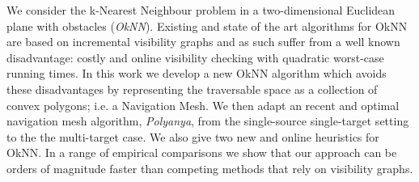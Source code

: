 We consider the k-Nearest Neighbour problem in a 
two-dimensional Euclidean plane with obstacles (\emph{OkNN}).
Existing and state of the art algorithms for OkNN are based on incremental 
visibility graphs and as such suffer from a well known disadvantage: costly 
and online visibility checking with quadratic worst-case running times.
In this work we develop a new OkNN algorithm which avoids these disadvantages
by representing the traversable space as a collection of convex polygons; i.e.
a Navigation Mesh. 
We then adapt an recent and optimal navigation mesh algorithm, \textit{Polyanya}, from the
single-source single-target setting to the the multi-target case. 
We also give two new and online heuristics for OkNN.
In a range of empirical comparisons we show that our approach can be orders of magnitude faster than competing methods that rely on visibility graphs.

